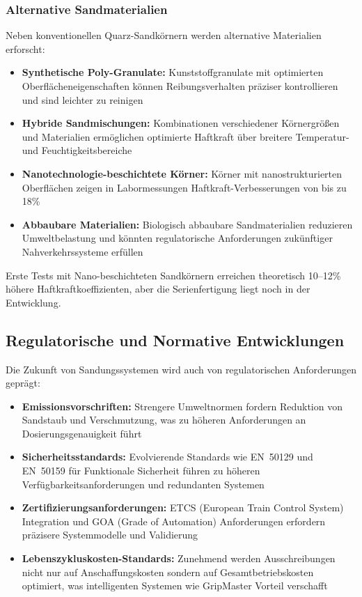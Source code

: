 \documentclass[a4paper,12pt]{article}
\theoremstyle{definition}
\theoremstyle{remark}
\begin{document}
\subsubsection{Alternative Sandmaterialien}

Neben konventionellen Quarz-Sandkörnern werden alternative Materialien erforscht:

\begin{itemize}
	\item \textbf{Synthetische Poly-Granulate:} Kunststoffgranulate mit optimierten Oberflächeneigenschaften können Reibungsverhalten präziser kontrollieren und sind leichter zu reinigen
	\item \textbf{Hybride Sandmischungen:} Kombinationen verschiedener Körnergrößen und Materialien ermöglichen optimierte Haftkraft über breitere Temperatur- und Feuchtigkeitsbereiche
	\item \textbf{Nanotechnologie-beschichtete Körner:} Körner mit nanostrukturierten Oberflächen zeigen in Labormessungen Haftkraft-Verbesserungen von bis zu 18\%
	\item \textbf{Abbaubare Materialien:} Biologisch abbaubare Sandmaterialien reduzieren Umweltbelastung und könnten regulatorische Anforderungen zukünftiger Nahverkehrssysteme erfüllen
\end{itemize}

Erste Tests mit Nano-beschichteten Sandkörnern erreichen theoretisch 10--12\% höhere Haftkraftkoeffizienten, aber die Serienfertigung liegt noch in der Entwicklung.

\subsection{Regulatorische und Normative Entwicklungen}

Die Zukunft von Sandungssystemen wird auch von regulatorischen Anforderungen geprägt:

\begin{itemize}
	\item \textbf{Emissionsvorschriften:} Strengere Umweltnormen fordern Reduktion von Sandstaub und Verschmutzung, was zu höheren Anforderungen an Dosierungsgenauigkeit führt
	\item \textbf{Sicherheitsstandards:} Evolvierende Standards wie EN~50129 und EN~50159 für Funktionale Sicherheit führen zu höheren Verfügbarkeitsanforderungen und redundanten Systemen
	\item \textbf{Zertifizierungsanforderungen:} ETCS (European Train Control System) Integration und GOA (Grade of Automation) Anforderungen erfordern präzisere Systemmodelle und Validierung
	\item \textbf{Lebenszykluskosten-Standards:} Zunehmend werden Ausschreibungen nicht nur auf Anschaffungskosten sondern auf Gesamtbetriebskosten optimiert, was intelligenten Systemen wie GripMaster Vorteil verschafft
\end{itemize}
\end{document}
